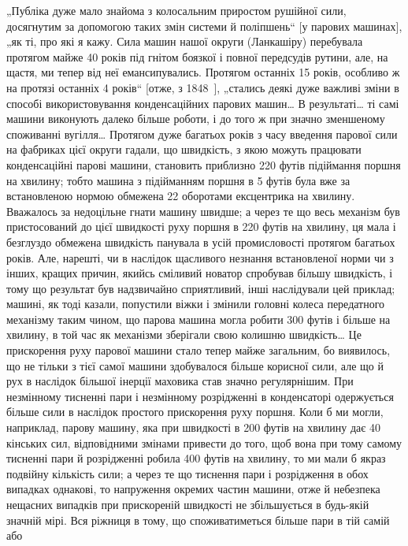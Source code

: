 „Публіка дуже мало знайома з колосальним приростом рушійної сили, досягнутим за допомогою таких змін
системи й поліпшень“ [у парових машинах], „як ті, про які я кажу. Сила машин нашої округи
(Ланкашіру) перебувала протягом майже 40 років
під гнітом боязкої і повної передсудів рутини, але, на щастя,
ми тепер від неї емансипувались. Протягом останніх 15 років,
особливо ж на протязі останніх 4 років“ [отже, з 1848~], „стались деякі дуже важливі зміни в
способі використовування конденсаційних парових машин\dots{} В результаті\dots{} ті самі машини виконують
далеко більше роботи, і до того ж при значно зменшеному споживанні вугілля\dots{} Протягом дуже багатьох
років
з часу введення парової сили на фабриках цієї округи гадали,
що швидкість, з якою можуть працювати конденсаційні парові
машини, становить приблизно 220 футів підіймання поршня на
хвилину; тобто машина з підійманням поршня в 5 футів була вже
за встановленою нормою обмежена 22 оборотами ексцентрика на
хвилину. Вважалось за недоцільне гнати машину швидше; а через
те що весь механізм був пристосований до цієї швидкості руху
поршня в 220 футів на хвилину, ця мала і безглуздо обмежена
швидкість панувала в усій промисловості протягом багатьох років.
Але, нарешті, чи в наслідок щасливого незнання встановленої норми
чи з інших, кращих причин, якийсь сміливий новатор спробував
більшу швидкість, і тому що результат був надзвичайно сприятливий, інші наслідували цей приклад;
машині, як тоді казали, попустили віжки і змінили головні колеса передатного механізму таким
чином, що парова машина могла робити 300 футів і більше на
хвилину, в той час як механізми зберігали свою колишню швидкість\dots{} Це прискорення руху парової
машини стало тепер майже
загальним, бо виявилось, що не тільки з тієї самої машини здобувалося більше корисної сили, але що й
рух в наслідок більшої
інерції маховика став значно регулярнішим. При незмінному
тисненні пари і незмінному розрідженні в конденсаторі одержується більше сили в наслідок простого
прискорення руху
поршня. Коли б ми могли, наприклад, парову машину, яка при
швидкості в 200 футів на хвилину дає 40 кінських сил, відповідними змінами привести до того, щоб
вона при тому самому тисненні
пари й розрідженні робила 400 футів на хвилину, то ми мали б
якраз подвійну кількість сили; а через те що тиснення пари
і розрідження в обох випадках однакові, то напруження окремих
частин машини, отже й небезпека нещасних випадків при прискореній швидкості не збільшується в
будь-якій значній мірі. Вся ріжниця в тому, що споживатиметься більше пари в тій самій або

